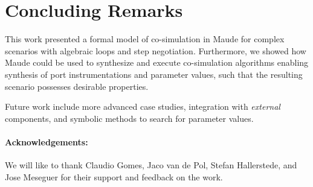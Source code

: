\section{Concluding Remarks}\label{sc:summary}
This work presented a formal model of co-simulation in Maude for complex scenarios with algebraic loops and step negotiation.
Furthermore, we showed how Maude could be used to synthesize and execute co-simulation algorithms enabling synthesis of port instrumentations and parameter values, such that the resulting scenario possesses desirable properties.

Future work include more advanced case studies, integration with \emph{external} components, and symbolic methods to search for parameter values.

\paragraph{Acknowledgements:}
We will like to thank Claudio Gomes, Jaco van de Pol, Stefan Hallerstede, and Jose Meseguer for their support and feedback on the work.